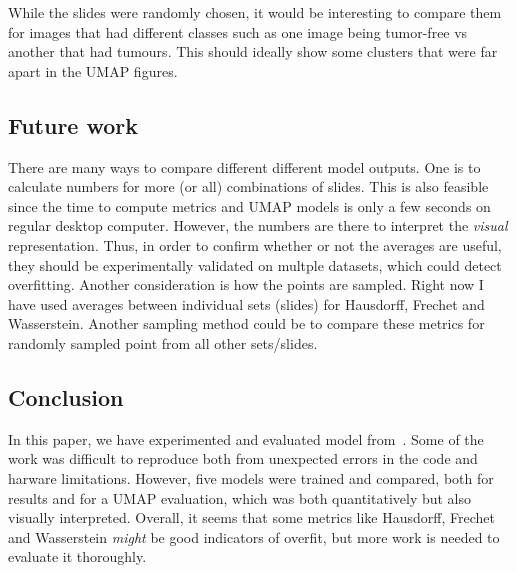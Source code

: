 \documentclass[10pt,twocolumn,letterpaper]{article}
\begin{document}
While the slides were randomly chosen, it would be interesting to compare them for images that had different classes such as one image being tumor-free vs another that had tumours. This should ideally show some clusters that were far apart in the \gls{UMAP} figures.

\subsection{Future work}\label{sec:futurework}
There are many ways to compare different different model outputs. One is to calculate numbers for more (or all) combinations of slides. This is also feasible since the time to compute metrics and \gls{UMAP} models is only a few seconds on regular desktop computer. However, the numbers are there to interpret the \textit{visual} representation. Thus, in order to confirm whether or not the averages are useful, they should be experimentally validated on multple datasets, which could detect overfitting. Another consideration is how the points are sampled. Right now I have used averages between individual sets (slides) for Hausdorff, Frechet and Wasserstein. Another sampling method could be to compare these metrics for randomly sampled point from all other sets/slides.

\subsection{Conclusion}
In this paper, we have experimented and evaluated model from~\cite{sslUMAP}. Some of the work was difficult to reproduce both from unexpected errors in the code and harware limitations. However, five models were trained and compared, both for results and for a \gls{UMAP} evaluation, which was both quantitatively but also visually interpreted. Overall, it seems that some metrics like Hausdorff, Frechet and Wasserstein \textit{might} be good indicators of overfit, but more work is needed to evaluate it thoroughly.

{\small


}
\end{document}
